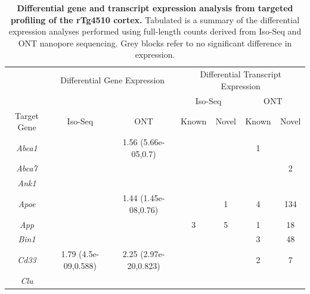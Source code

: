 \begin{table}[]
	\centering
	\captionsetup{width=0.95\textwidth}
	\caption[Differential expression analysis from targeted profiling of the rTg4510 cortex]%
	{\textbf{Differential gene and transcript expression analysis from targeted profiling of the rTg4510 cortex.} Tabulated is a summary of the differential expression analyses performed using full-length counts derived from Iso-Seq and ONT nanopore sequencing. Grey blocks refer to no significant difference in expression.}
	\label{tab: de_analysis}
	\setlength\tabcolsep{4pt} %
	\begin{threeparttable}
	\begin{tabular}{@{}ccccccc@{}}
		\toprule
		&
		\multicolumn{2}{c}{Differential Gene Expression\tnote{a} } &
		\multicolumn{4}{c}{Differential Transcript Expression\tnote{b}} \\ \cmidrule(l){2-7} 
		&
		&
		&
		\multicolumn{2}{c}{Iso-Seq} &
		\multicolumn{2}{c}{ONT} \\ \cmidrule(l){4-7} 
		\multirow{-3}{*}{Target Gene} &
		\multirow{-2}{*}{Iso-Seq} &
		\multirow{-2}{*}{ONT} &
		Known &
		Novel &
		Known &
		Novel \\ \midrule
		\textit{Abca1} &
		\cellcolor[HTML]{EFEFEF} &
		1.56 (5.66e-05,0.7) &
		\cellcolor[HTML]{EFEFEF} &
		\cellcolor[HTML]{EFEFEF} &
		1 &
		\cellcolor[HTML]{EFEFEF} \\
		\textit{Abca7} &
		\cellcolor[HTML]{EFEFEF} &
		\cellcolor[HTML]{EFEFEF} &
		\cellcolor[HTML]{EFEFEF} &
		\cellcolor[HTML]{EFEFEF} &
		\cellcolor[HTML]{EFEFEF} &
		2 \\
		\textit{Ank1} &
		\cellcolor[HTML]{EFEFEF} &
		\cellcolor[HTML]{EFEFEF} &
		\cellcolor[HTML]{EFEFEF} &
		\cellcolor[HTML]{EFEFEF} &
		\cellcolor[HTML]{EFEFEF} &
		\cellcolor[HTML]{EFEFEF} \\
		\textit{Apoe} &
		\cellcolor[HTML]{EFEFEF} &
		1.44 (1.45e-08,0.76) &
		\cellcolor[HTML]{EFEFEF}&
		1 &
		4 &
		134 \\
		\textit{App} &
		\cellcolor[HTML]{EFEFEF} &
		\cellcolor[HTML]{EFEFEF} &
		3 &
		5 &
		1 &
		18 \\
		\textit{Bin1} &
		\cellcolor[HTML]{EFEFEF} &
		\cellcolor[HTML]{EFEFEF} &
		\cellcolor[HTML]{EFEFEF} &
		\cellcolor[HTML]{EFEFEF} &
		3 &
		48 \\
		\textit{Cd33} &
		1.79 (4.5e-09,0.588) &
		2.25 (2.97e-20,0.823) &
		\cellcolor[HTML]{EFEFEF} &
		\cellcolor[HTML]{EFEFEF} &
		2 &
		7 \\
		\textit{Clu} &
		\cellcolor[HTML]{EFEFEF} &

\end{tabular}
\end{threeparttable}
\end{table}
